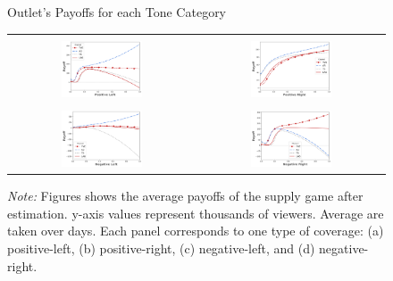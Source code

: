 \documentclass[12pt]{article}
\begin{document}
\begin{figure}[!htb]
	\caption{Outlet's Payoffs for each Tone Category}
	\centering
	\begin{tabular}{@{}cc@{}}
		\text{(a) Positive Left } &
		\text{(b) Positive Right} \\[0.08em]
		\includegraphics[width=0.45\textwidth]{figures/payoff_pos_left} &
		\includegraphics[width=0.45\textwidth]{figures/payoff_pos_right} \\[1em]
		\text{(c) Negative Left} &
		\text{(d) Negative Right} \\[0.08em]
		\includegraphics[width=0.45\textwidth]{figures/payoff_neg_left} &
		\includegraphics[width=0.45\textwidth]{figures/payoff_neg_right}
	\end{tabular}
	\caption*{\small \textit{Note:} Figures shows the average payoffs of the supply game after estimation. y-axis values represent thousands of viewers. Average are taken over days. Each panel corresponds to one type of coverage: 
		(a) positive-left, (b) positive-right, (c) negative-left, and (d) negative-right.}
	\label{fig:payoffs}
\end{figure}
\end{document}
